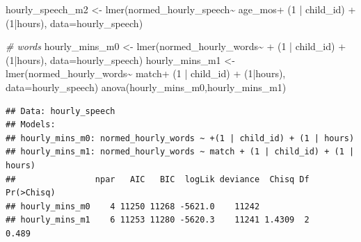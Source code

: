 \documentclass[
]{article}
\newenvironment{Shaded}{\begin{snugshade}}{\end{snugshade}}
\newcommand{\AttributeTok}[1]{\textcolor[rgb]{0.77,0.63,0.00}{#1}}
\newcommand{\CommentTok}[1]{\textcolor[rgb]{0.56,0.35,0.01}{\textit{#1}}}
\newcommand{\DecValTok}[1]{\textcolor[rgb]{0.00,0.00,0.81}{#1}}
\newcommand{\FunctionTok}[1]{\textcolor[rgb]{0.00,0.00,0.00}{#1}}
\newcommand{\NormalTok}[1]{#1}
\newcommand{\OtherTok}[1]{\textcolor[rgb]{0.56,0.35,0.01}{#1}}
\newcommand{\SpecialCharTok}[1]{\textcolor[rgb]{0.00,0.00,0.00}{#1}}
\begin{document}
\begin{Shaded}
\begin{Highlighting}[]
\NormalTok{hourly\_speech\_m2 }\OtherTok{\textless{}{-}} \FunctionTok{lmer}\NormalTok{(normed\_hourly\_speech}\SpecialCharTok{\textasciitilde{}}\NormalTok{ age\_mos}\SpecialCharTok{+}\NormalTok{ (}\DecValTok{1} \SpecialCharTok{|}\NormalTok{ child\_id) }\SpecialCharTok{+}\NormalTok{ (}\DecValTok{1}\SpecialCharTok{|}\NormalTok{hours), }\AttributeTok{data=}\NormalTok{hourly\_speech)}

\CommentTok{\# words}
\NormalTok{hourly\_mins\_m0 }\OtherTok{\textless{}{-}} \FunctionTok{lmer}\NormalTok{(normed\_hourly\_words}\SpecialCharTok{\textasciitilde{}} \SpecialCharTok{+}\NormalTok{ (}\DecValTok{1} \SpecialCharTok{|}\NormalTok{ child\_id) }\SpecialCharTok{+}\NormalTok{ (}\DecValTok{1}\SpecialCharTok{|}\NormalTok{hours), }\AttributeTok{data=}\NormalTok{hourly\_speech)}
\NormalTok{hourly\_mins\_m1 }\OtherTok{\textless{}{-}} \FunctionTok{lmer}\NormalTok{(normed\_hourly\_words}\SpecialCharTok{\textasciitilde{}}\NormalTok{ match}\SpecialCharTok{+}\NormalTok{ (}\DecValTok{1} \SpecialCharTok{|}\NormalTok{ child\_id) }\SpecialCharTok{+}\NormalTok{ (}\DecValTok{1}\SpecialCharTok{|}\NormalTok{hours), }\AttributeTok{data=}\NormalTok{hourly\_speech)}
\FunctionTok{anova}\NormalTok{(hourly\_mins\_m0,hourly\_mins\_m1)}
\end{Highlighting}
\end{Shaded}

\begin{verbatim}
## Data: hourly_speech
## Models:
## hourly_mins_m0: normed_hourly_words ~ +(1 | child_id) + (1 | hours)
## hourly_mins_m1: normed_hourly_words ~ match + (1 | child_id) + (1 | hours)
##                npar   AIC   BIC  logLik deviance  Chisq Df Pr(>Chisq)
## hourly_mins_m0    4 11250 11268 -5621.0    11242                     
## hourly_mins_m1    6 11253 11280 -5620.3    11241 1.4309  2      0.489
\end{verbatim}
\end{document}
